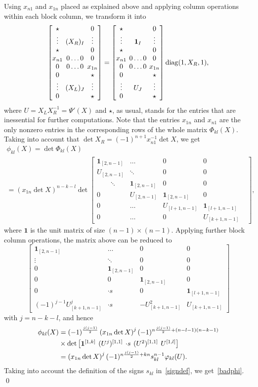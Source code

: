 \documentclass{amsart}
\theoremstyle{definition}
\theoremstyle{remark}
\numberwithin{equation}{section}
\numberwithin{theorem}{section}
\def\Nphi{{\mathsf\Phi}}
\def\fy{\varphi}
\def\nar{\setlength\arraycolsep{2pt}}
\def\one{\mathbf 1}
\def\diag{\operatorname{diag}}
\begin{document}
Using $x_{n1}$ and $x_{1n}$ placed as explained above and applying column operations within each block column, we transform it into
\[
\nar\begin{bmatrix}
\star & & 0\cr
\vdots & (X_R)_I &\vdots\cr
\star & & 0\cr
x_{n1}& 0\dots0& 0\cr
0& 0\dots0& x_{1n}\cr
0 && \star\cr
\vdots & (X_L)_J &\vdots\cr
0 && \star
\end{bmatrix}=
\begin{bmatrix}
\star & & 0\cr
\vdots & \one_I &\vdots\cr
\star & & 0\cr
x_{n1}& 0\dots0& 0\cr
0& 0\dots0& x_{1n}\cr
0 && \star\cr
\vdots & U_J &\vdots\cr
0 && \star
\end{bmatrix}\diag (1, X_R, 1),
\]
where $U=X_LX_R^{-1}=\Psi'(X)$ and $\star$, as usual, stands for the entries that are inessential for further computations. Note that the entries
$x_{1n}$ and $x_{n1}$ are the only nonzero entries in the corresponding rows of the whole matrix $\Nphi_{kl}(X)$. 
Taking into account that $\det X_R=(-1)^{n+1}x_{n1}^{-1}\det X$, we get
\begin{multline*}
\phi_{kl}(X)=\det\Nphi_{kl}(X)\\=(x_{1n}\det X)^{n-k-l}\det
\begin{bmatrix} \one_{[2,n-1]} & \dots& 0& 0 \\ U_{[2,n-1]} &\ddots & 0& 0\\
  \qquad  \ddots & \one_{[2,n-1]} &0 & 0\\
 0&U_{[2,n-1]}& \one_{[2,n-1]}& 0\\
 0&\dots & U_{[l+1,n-1]} & \one_{[l+1,n-1]}\\
 0&\dots & 0&  U_{[k+1,n-1]}&
 \end{bmatrix},
\end{multline*}
where $\one$ is the unit matrix of size $(n-1)\times(n-1)$. 
Applying further block column operations, the matrix above can be reduced to
\[
\begin{bmatrix} 
\one_{[2,n-1]} &\dots & 0& 0 \\ 
\vdots  & \ddots& 0& 0\\
 0 & \one_{[2,n-1]} & 0& 0\\
0 &0 & \one_{[2,n-1]}& 0\\
0 &{\cdot}s & 0 & \one_{[l+1,n-1]}\\
(-1)^{j-1}U^{j}_{[k+1,n-1]} & {\cdot}s & - U^2_{[k+1,n-1]}&  U_{[k+1,n-1]}
 \end{bmatrix}
\]
with $j=n-k-l$, and hence
\begin{align*}
\phi_{kl}(X)&=(-1)^{\frac{j(j-1)}{2}}\left (x_{1n}\det X \right )^{j}(-1)^{n\frac{j(j-1)}2+(n-l-1)(n-k-1)}\\
&\times\det \nar\begin{bmatrix} \one^{[1,k]}& (U^{j})^{[1,1]} & {\cdot}s &(U^2)^{[1,1]} &  U^{[1,l]}  \end{bmatrix}\\
&= \left (x_{1n}\det X \right )^j (-1)^{n\frac{j(j-1)}2+kn} s_{kl}^{n-1} \fy_{kl}(U).
\end{align*}
Taking into account the definition of the signs $s_{kl}$ in~\eqref{signdef}, we get~\eqref{badphi}. \qed
\end{document}
